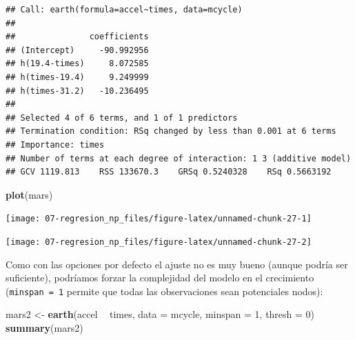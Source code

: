 \documentclass[
  spanish,
]{book}
\newenvironment{Shaded}{\begin{snugshade}}{\end{snugshade}}
\newcommand{\DataTypeTok}[1]{\textcolor[rgb]{0.13,0.29,0.53}{#1}}
\newcommand{\DecValTok}[1]{\textcolor[rgb]{0.00,0.00,0.81}{#1}}
\newcommand{\KeywordTok}[1]{\textcolor[rgb]{0.13,0.29,0.53}{\textbf{#1}}}
\newcommand{\NormalTok}[1]{#1}
\newcommand{\OperatorTok}[1]{\textcolor[rgb]{0.81,0.36,0.00}{\textbf{#1}}}
\newcommand{\StringTok}[1]{\textcolor[rgb]{0.31,0.60,0.02}{#1}}
\theoremstyle{break}
\theoremstyle{definition}
\theoremstyle{definition}
\theoremstyle{definition}
\theoremstyle{remark}
\begin{document}
\begin{verbatim}
## Call: earth(formula=accel~times, data=mcycle)
## 
##               coefficients
## (Intercept)     -90.992956
## h(19.4-times)     8.072585
## h(times-19.4)     9.249999
## h(times-31.2)   -10.236495
## 
## Selected 4 of 6 terms, and 1 of 1 predictors
## Termination condition: RSq changed by less than 0.001 at 6 terms
## Importance: times
## Number of terms at each degree of interaction: 1 3 (additive model)
## GCV 1119.813    RSS 133670.3    GRSq 0.5240328    RSq 0.5663192
\end{verbatim}

\begin{Shaded}
\begin{Highlighting}[]
\KeywordTok{plot}\NormalTok{(mars)}
\end{Highlighting}
\end{Shaded}

\begin{center}\texttt{[image: 07-regresion\_np\_files/figure-latex/unnamed-chunk-27-1]} \end{center}

\begin{Shaded}
\end{Shaded}

\begin{center}\texttt{[image: 07-regresion\_np\_files/figure-latex/unnamed-chunk-27-2]} \end{center}

Como con las opciones por defecto el ajuste no es muy bueno (aunque podría ser suficiente), podríamos forzar la complejidad del modelo en el crecimiento (\texttt{minspan\ =\ 1} permite que todas las observaciones sean potenciales nodos):

\begin{Shaded}
\begin{Highlighting}[]
\NormalTok{mars2 <-}\StringTok{ }\KeywordTok{earth}\NormalTok{(accel }\OperatorTok{~}\StringTok{ }\NormalTok{times, }\DataTypeTok{data =}\NormalTok{ mcycle, }\DataTypeTok{minspan =} \DecValTok{1}\NormalTok{, }\DataTypeTok{thresh =} \DecValTok{0}\NormalTok{)}
\KeywordTok{summary}\NormalTok{(mars2)}
\end{Highlighting}
\end{Shaded}
\end{document}
